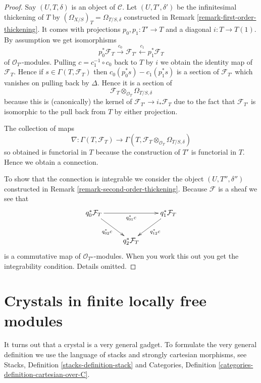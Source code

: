 \begin{proof}
Say $(U, T, \delta)$ is an object of $\mathcal{C}$.
Let $(U, T', \delta')$ be the infinitesimal thickening of $T$
by $(\Omega_{X/S})_T = \Omega_{T/S, \delta}$
constructed in Remark \ref{remark-first-order-thickening}.
It comes with projections $p_0, p_1 : T' \to T$
and a diagonal $i : T \to T(1)$. By assumption we get
isomorphisms
$$
p_0^*\mathcal{F}_T \xrightarrow{c_0}
\mathcal{F}_{T'} \xleftarrow{c_1}
p_1^*\mathcal{F}_T
$$
of $\mathcal{O}_{T'}$-modules. Pulling $c = c_1^{-1} \circ c_0$
back to $T$ by $i$ we obtain the identity map
of $\mathcal{F}_T$. Hence if $s \in \Gamma(T, \mathcal{F}_T)$
then $c_0(p_0^*s) - c_1(p_1^*s)$ is a section of $\mathcal{F}_{T'}$
which vanishes on pulling back by $\Delta$. Hence
it is a section of
$$
\mathcal{F}_T
\otimes_{\mathcal{O}_T}
\Omega_{T/S, \delta}
$$
because this is (canonically) the kernel of
$\mathcal{F}_{T'} \to i_*\mathcal{F}_T$ due 
to the fact that $\mathcal{F}_{T'}$
is isomorphic to the pull back from $T$ by either projection.

\medskip\noindent
The collection of maps
$$
\nabla : \Gamma(T, \mathcal{F}_T) \to
\Gamma(T, \mathcal{F}_T \otimes_{\mathcal{O}_T} \Omega_{T/S, \delta})
$$
so obtained is functorial in $T$ because the construction of $T'$
is functorial in $T$. Hence we obtain a connection.

\medskip\noindent
To show that the connection is integrable we consider the
object $(U, T'', \delta'')$ constructed in
Remark \ref{remark-second-order-thickening}.
Because $\mathcal{F}$ is a sheaf we see that
$$
\xymatrix{
q_0^*\mathcal{F}_T \ar[rr]_{q_{01}^*c} \ar[rd]_{q_{02}^*c} & &
q_1^*\mathcal{F}_T \ar[ld]^{q_{12}^*c} \\
& q_2^*\mathcal{F}_T
}
$$
is a commutative map of $\mathcal{O}_{T''}$-modules.
When you work this out you get the integrability
condition. Details omitted.
\end{proof}




\section{Crystals in finite locally free modules}
\label{section-crystals}

\noindent
It turns out that a crystal is a very general gadget.
To formulate the very general definition we use the language
of stacks and strongly cartesian morphisms, see
Stacks, Definition \ref{stacks-definition-stack} and
Categories, Definition \ref{categories-definition-cartesian-over-C}.

